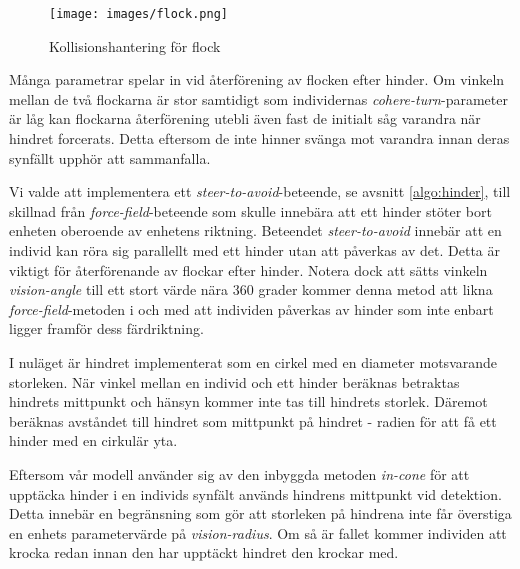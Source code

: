 \documentclass[titlepage, a4paper, 12pt]{article}
\begin{document}
\begin{figure}[H]
  \begin{center}
    \texttt{[image: images/flock.png]}
    \caption{Kollisionshantering för flock}
    \label{fig:flock}
  \end{center}
\end{figure}

Många parametrar spelar in vid återförening av flocken efter
hinder. Om vinkeln mellan de två flockarna är stor samtidigt som
individernas \textit{cohere-turn}-parameter är låg kan flockarna
återförening utebli även fast de initialt såg varandra när hindret
forcerats. Detta eftersom de inte hinner svänga mot varandra innan
deras synfällt upphör att sammanfalla.

Vi valde att implementera ett \textit{steer-to-avoid}-beteende, se
avsnitt \ref{algo:hinder}, till skillnad från
\textit{force-field}-beteende som skulle innebära att ett hinder
stöter bort enheten oberoende av enhetens riktning. Beteendet
\textit{steer-to-avoid} innebär att en individ kan röra sig parallellt
med ett hinder utan att påverkas av det. Detta är viktigt för
återförenande av flockar efter hinder. Notera dock att sätts vinkeln
\textit{vision-angle} till ett stort värde nära 360 grader kommer
denna metod att likna \textit{force-field}-metoden i och med att
individen påverkas av hinder som inte enbart ligger framför dess
färdriktning.

I nuläget är hindret implementerat som en cirkel med en diameter
motsvarande storleken. När vinkel mellan en individ och ett hinder
beräknas betraktas hindrets mittpunkt och hänsyn kommer inte tas till
hindrets storlek. Däremot beräknas avståndet till hindret som
mittpunkt på hindret - radien för att få ett hinder med en
cirkulär yta.

Eftersom vår modell använder sig av den inbyggda metoden
\textit{in-cone} för att upptäcka hinder i en individs synfält används
hindrens mittpunkt vid detektion. Detta innebär en begränsning som gör
att storleken på hindrena inte får överstiga en enhets parametervärde
på \textit{vision-radius}. Om så är fallet kommer individen att krocka
redan innan den har upptäckt hindret den krockar med.
\end{document}
